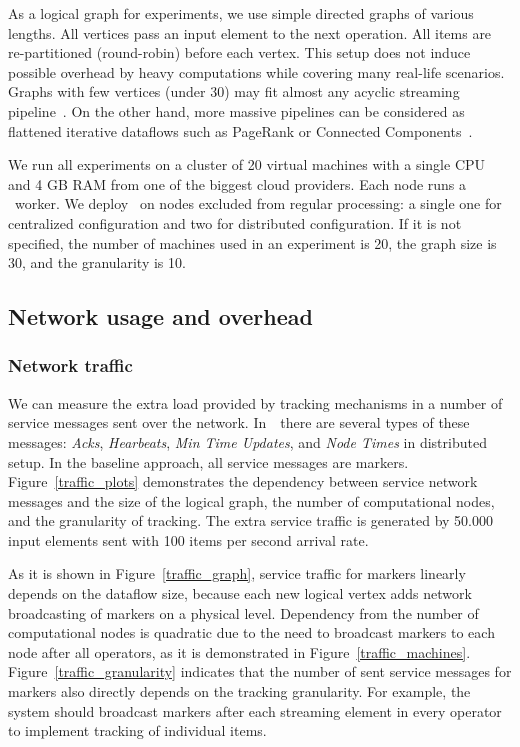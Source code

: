 As a logical graph for experiments, we use simple directed graphs of various lengths. All vertices pass an input element to the next operation. All items are re-partitioned (round-robin) before each vertex. This setup does not induce possible overhead by heavy computations while covering many real-life scenarios. Graphs with few vertices (under 30) may fit almost any acyclic streaming pipeline~\cite{akidau2018streaming}. 
On the other hand, more massive pipelines can be considered as flattened iterative dataflows such as PageRank or Connected Components~\cite{Murray:2013:NTD:2517349.2522738, xu2016efficient}. 

We run all experiments on a cluster of 20 virtual machines with a single CPU and 4 GB RAM from one of the biggest cloud providers. Each node runs a \FlameStream\ worker. We deploy \tracker\ on nodes excluded from regular processing: a single one for centralized configuration and two for distributed configuration. If it is not specified, the number of machines used in an experiment is 20, the graph size is 30, and the granularity is 10. 

\subsection{Network usage and overhead} \label{overhead}

\subsubsection{Network traffic}

We can measure the extra load provided by tracking mechanisms in a number of service messages sent over the network. In~\tracker\ there are several types of these messages: {\em Acks}, {\em Hearbeats}, {\em Min Time Updates}, and {\em Node Times} in distributed setup. In the baseline approach, all service messages are markers. Figure~\ref{traffic_plots} demonstrates the dependency between service network messages and the size of the logical graph, the number of computational nodes, and the granularity of tracking. The extra service traffic is generated by 50.000 input elements sent with 100 items per second arrival rate. 

As it is shown in Figure~\ref{traffic_graph}, service traffic for markers linearly depends on the dataflow size, because each new logical vertex adds network broadcasting of markers on a physical level. Dependency from the number of computational nodes is quadratic due to the need to broadcast markers to each node after all operators, as it is demonstrated in Figure~\ref{traffic_machines}. Figure~\ref{traffic_granularity} indicates that the number of sent service messages for markers also directly depends on the tracking granularity. For example, the system should broadcast markers after each streaming element in every operator to implement tracking of individual items. 

